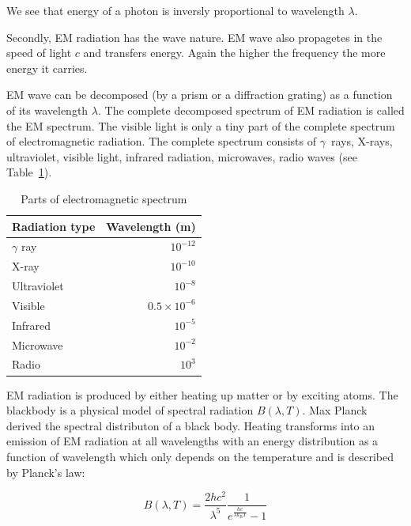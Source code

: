 We see that energy of a photon is inversly proportional to wavelength \(\lambda\).~\cite{trypsteen2017}

Secondly, EM radiation has the wave nature. 
EM wave also propagetes in the speed of light \(c\) and transfers energy.
Again the higher the frequency the more energy it carries.~\cite{cochard2018}

EM wave can be decomposed (by a prism or a diffraction grating)
as a function of its wavelength \(\lambda\).
The complete decomposed spectrum of EM radiation is called the EM spectrum.
The visible light is only a tiny part of the complete spectrum of electromagnetic radiation.
The complete spectrum consists of \(\gamma\)~rays, X-rays, ultraviolet, visible light, infrared radiation, microwaves, radio waves (see Table~\ref{em_spectrum}).

\begin{table}
\begin{center}
\begin{tabular}{|l|r|}
	\hline
	Radiation type & Wavelength (m) \\ \hline \hline
	\(\gamma\) ray & \(10^{-12}\) \\ \hline
	X-ray & \(10^{-10}\) \\ \hline
	Ultraviolet & \(10^{-8}\) \\ \hline
	Visible & \(0.5 \times 10^{-6}\) \\ \hline
	Infrared & \(10^{-5}\) \\ \hline
	Microwave & \(10^{-2}\) \\ \hline
	Radio & \(10^{3}\) \\ \hline
\end{tabular}
\end{center}
\caption{Parts of electromagnetic spectrum}
\label{em_spectrum}
\end{table}

EM radiation is produced by either heating up matter or by exciting atoms.
The blackbody is a physical model of spectral radiation \(B(\lambda, T)\).
Max Planck derived the spectral distributon of a black body.
Heating transforms into an emission of EM radiation at all wavelengths
with an energy distribution as a function of wavelength
which only depends on the temperature and is described by Planck's law:

\begin{equation}
	B(\lambda, T) = \frac{2 h c^2}{\lambda^5}
	\frac{1}{e^{\frac{hc}{\lambda k_{\mathrm{B}}T}} - 1}
\end{equation}

